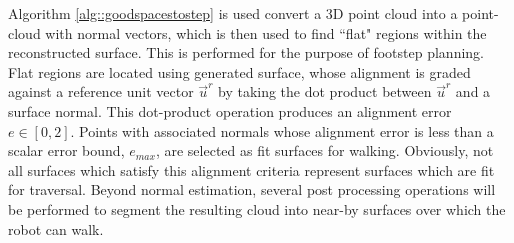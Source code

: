 			Algorithm \ref{alg::goodspacestostep} is used convert a 3D point cloud into a point-cloud with normal vectors, which is then used to find ``flat" regions within the reconstructed surface. This is performed for the purpose of footstep planning. Flat regions are located using generated surface, whose alignment is graded against a reference unit vector $\vec{u}^{r}$ by taking the dot product between  $\vec{u}^{r}$ and a surface normal. This dot-product operation produces an alignment error $e\in[0,2]$. Points with associated normals whose alignment error is less than a scalar error bound, $e_{max}$, are selected as fit surfaces for walking. Obviously, not all surfaces which satisfy this alignment criteria represent surfaces which are fit for traversal. Beyond normal estimation, several post processing operations will be performed to segment the resulting cloud into near-by surfaces over which the robot can walk. 

